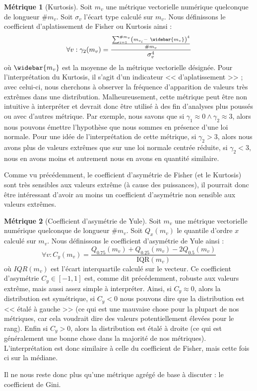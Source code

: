\documentclass{rapport}
\theoremstyle{definition}
\theoremstyle{remark}
\theoremstyle{definition}
\newtheorem*{metric}{Métrique}
\theoremstyle{remark}
\begin{document}
\begin{metric}[Kurtosis]
    Soit $m_v$ une métrique vectorielle numérique quelconque de longueur $\#m_v$. Soit $\sigma_v$ l'écart type calculé sur $m_v$. Nous définissons le coefficient d'aplatissement de Fisher ou Kurtosis ainsi :
    $$
        \forall v : \gamma_2 (m_v) = \frac{\frac{\sum_{i=1}^{\#m_v}\left(m_{v_i}-\ \widebar{m_v}\right)^4}{\#m_v}}{\sigma_v^4}
    $$
    où $\widebar{m_v}$ est la moyenne de la métrique vectorielle désignée. Pour l'interprétation du Kurtosis, il s'agit d'un indicateur << d'aplatissement >> ; avec celui-ci, nous cherchons à observer la fréquence d'apparition de valeurs très extrêmes dans une distribution. Malheureusement, cette métrique peut être non intuitive à interpréter et devrait donc être utilisé à des fin d'analyses plus poussés ou avec d'autres métrique.
    Par exemple, nous savons que si $\gamma_1\approx0\land\gamma_2\approx3$, alors nous pouvons émettre l'hypothèse que nous sommes en présence d'une loi normale. Pour une idée de l'interprétation de cette métrique, si $\gamma_2>3$, alors nous avons plus de valeurs extrêmes que sur une loi normale centrée réduite, si $\gamma_2<3$, nous en avons moins et autrement nous en avons en quantité similaire.
\end{metric}
Comme vu précédemment, le coefficient d'asymétrie de Fisher (et le Kurtosis) sont très sensibles aux valeurs extrême (à cause des puissances), il pourrait donc être intéressant d'avoir au moins un coefficient d'asymétrie non sensible aux valeurs extrêmes.
\begin{metric}[Coefficient d'asymétrie de Yule]
    Soit $m_v$ une métrique vectorielle numérique quelconque de longueur $\#m_v$. Soit $Q_x(m_v)$ le quantile d'ordre $x$ calculé sur $m_v$. Nous définissons le coefficient d'asymétrie de Yule ainsi :
    $$
        \forall v : C_y(m_v) = \frac{Q_{0.75}(m_v)+Q_{0.25}(m_v)-2Q_{0.5}(m_v)}{\text{IQR}(m_v)}
    $$
    où $IQR(m_v)$ est l'écart interquartile calculé sur le vecteur.
    Ce coefficient d'asymétrie $C_y\in[-1,1]$ est, comme dit précédemment, robuste aux valeurs extrême, mais aussi assez simple à interpréter.
    Ainsi, si $C_y\approx 0$, alors la distribution est symétrique, si $C_y<0$ nous pouvons dire que la distribution est << étalé à gauche >> (ce qui est une mauvaise chose pour la plupart de nos métriques, car cela voudrait dire des valeurs potentiellement élevées pour le rang).
    Enfin si $C_y > 0$, alors la distribution est étalé à droite (ce qui est généralement une bonne chose dans la majorité de nos métriques). L'interprétation est donc similaire à celle du coefficient de Fisher, mais cette fois ci sur la médiane.
\end{metric}
Il ne nous reste donc plus qu'une métrique agrégé de base à discuter : le coefficient de Gini.
\end{document}

